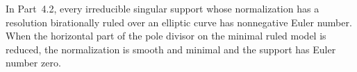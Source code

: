 
\begin{proposition}[P4R.9]\hypertarget{tag-02YL}{}\label{night:P4R.9}\label{stmt:P4R.9}


In Part~4.2, every irreducible singular
support whose normalization has a
resolution birationally ruled over an
elliptic curve has nonnegative Euler
number. When the horizontal part of
the pole divisor on the minimal ruled
model is reduced, the normalization
is smooth and minimal and the support
has Euler number zero.
\end{proposition}


